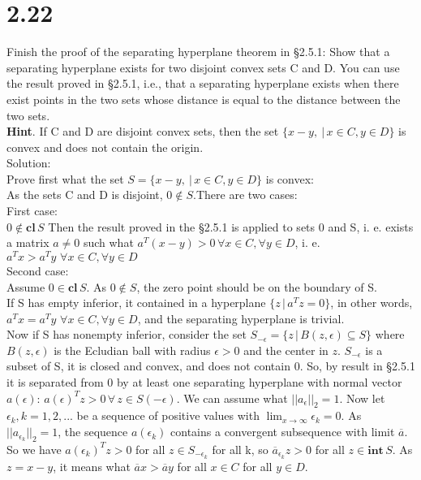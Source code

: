 \documentclass{article}
\begin{document}
\section*{2.22}
Finish the proof of the separating hyperplane theorem in \S 2.5.1: Show that a separating
hyperplane exists for two disjoint convex sets C and D. You can use the result proved
in \S 2.5.1, i.e., that a separating hyperplane exists when there exist points in the two sets
whose distance is equal to the distance between the two sets.\\
{\bf Hint}. If C and D are disjoint convex sets, then the set $\{x - y ,\ | \, x \in C , y \in D\}$ is convex
and does not contain the origin. \\ 
Solution: \\
Prove first what the set $S = \{x - y ,\ | \, x \in C , y \in D\}$ is convex: \\
As the sets C and D is disjoint, $0 \notin S$.There are two cases: \\ First case: \\ $0 \notin \boldsymbol{cl} \, S$ Then the result proved in the \S 2.5.1 is applied to sets 0 and S, i. e. exists a matrix $a \ne 0$ such what ${a^T (x - y) > 0} \, \forall x \in C, \forall y \in D$, i. e. ${a^T x > a^T y} \, \, \forall x \in C, \forall y \in D$
\\Second case: \\ Assume $0 \in \boldsymbol{cl} \, S$. 
As $0 \notin S$, the zero point should be on the boundary of S. \\ If S has empty inferior, it contained in a hyperplane $\{z\, | \,a^Tz = 0\}$, in other words, ${a^T x = a^T y} \, \, \forall x \in C, \forall y \in D$, and the separating hyperplane is trivial. 
\\ Now if S has nonempty inferior, consider the set 
${S_{- \epsilon} = \{z \,| \,B(z,\epsilon)  \subseteq S\}}$
where $B(z,\epsilon)$ is the Ecludian ball with radius $\epsilon > 0$ and the center in $z$. $S_{- \epsilon}$ is a subset of S, it is closed and convex, and does not contain $0$. So, by result in \S 2.5.1 it is separated from $0$ by at least one separating hyperplane with normal vector $a(\epsilon)$: $a(\epsilon)^T z > 0 \, \forall \, z \in S(-\epsilon)$. We can assume what $||a_{\epsilon}||_2 = 1$. Now let $\epsilon_k, k = 1, 2, ... $ be a sequence of positive values with $\lim_{x \to \infty} \epsilon_k = 0$. As $||a_{\epsilon_k}||_2 = 1$, the sequence $a(\epsilon_k)$ contains a convergent subsequence with limit $\overline{a}$. So we have $a(\epsilon_k)^T z > 0$ for all $z \in S_{- \epsilon_k}$ for all k, so $\overline{a}_{\epsilon_k} z > 0$ for all $z \in \boldsymbol{int} \, S$. As $z = x - y$, it means what 
$\overline{a}x > \overline{a}y$ for all $x \in C$ for all $y \in D$.
\end{document}
